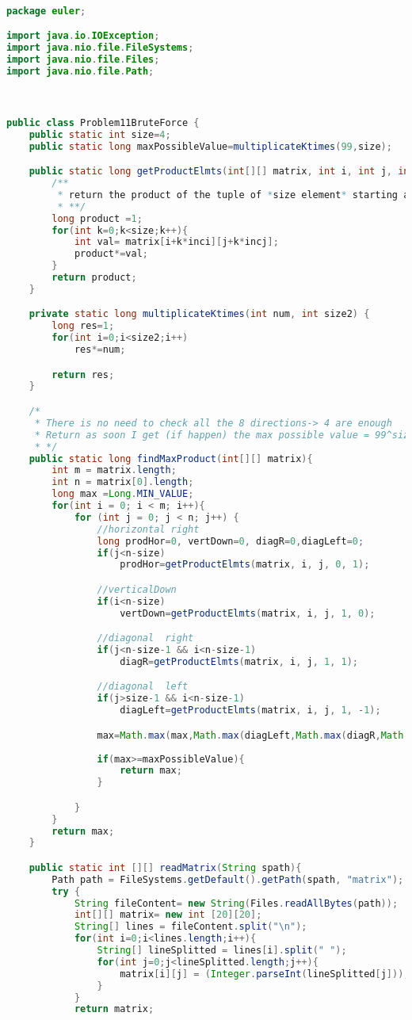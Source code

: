 \begin{solution}

		\begin{lstlisting}[language=Java, caption="Java"]
        
package euler;

import java.io.IOException;
import java.nio.file.FileSystems;
import java.nio.file.Files;
import java.nio.file.Path;



public class Problem11BruteForce {
	public static int size=4;
	public static long maxPossibleValue=multiplicateKtimes(99,size);

	public static long getProductElmts(int[][] matrix, int i, int j, int inci, int incj){
		/**
		 * return the product of the tuple of *size element* starting at i,j in the direction of the vector (inci,incj)
		 * **/
		long product =1;
		for(int k=0;k<size;k++){
			int val= matrix[i+k*inci][j+k*incj];
			product*=val;
		}
		return product;
	}

	private static long multiplicateKtimes(int num, int size2) {
		long res=1;
		for(int i=0;i<size2;i++)
			res*=num;	

		return res;
	}

	/*
	 * There is no need to check all the 8 directions-> 4 are enough
	 * Return as soon I get (if happen) the max possible value = 99^size
	 * */
	public static long findMaxProduct(int[][] matrix){
		int m = matrix.length;
		int n = matrix[0].length;
		long max =Long.MIN_VALUE;
		for(int i = 0; i < m; i++){
			for (int j = 0; j < n; j++) {
				//horizontal right
				long prodHor=0, vertDown=0, diagR=0,diagLeft=0;
				if(j<n-size)
					prodHor=getProductElmts(matrix, i, j, 0, 1);

				//verticalDown 
				if(i<n-size)
					vertDown=getProductElmts(matrix, i, j, 1, 0);

				//diagonal  right
				if(j<n-size-1 && i<n-size-1)
					diagR=getProductElmts(matrix, i, j, 1, 1);

				//diagonal  left
				if(j>size-1 && i<n-size-1)
					diagLeft=getProductElmts(matrix, i, j, 1, -1);

				max=Math.max(max,Math.max(diagLeft,Math.max(diagR,Math.max(prodHor, vertDown))));
				
				if(max>=maxPossibleValue){
					return max;
				}

			}
		}
		return max;
	}

	public static int [][] readMatrix(String spath){
		Path path = FileSystems.getDefault().getPath(spath, "matrix");
		try {
			String fileContent= new String(Files.readAllBytes(path));
			int[][] matrix= new int [20][20];
			String[] lines = fileContent.split("\n");
			for(int i=0;i<lines.length;i++){
				String[] lineSplitted = lines[i].split(" ");
				for(int j=0;j<lineSplitted.length;j++){
					matrix[i][j] = (Integer.parseInt(lineSplitted[j]));
				}
			}
			return matrix;



\end{lstlisting}
\end{solution}
